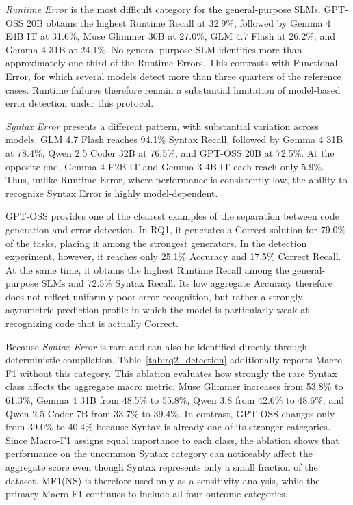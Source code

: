\emph{Runtime Error} is the most difficult category for the general-purpose SLMs. GPT-OSS 20B obtains the highest Runtime Recall at 32.9\%, followed by Gemma 4 E4B IT at 31.6\%, Muse Glimmer 30B at 27.0\%, GLM 4.7 Flash at 26.2\%, and Gemma 4 31B at 24.1\%. No general-purpose SLM identifies more than approximately one third of the Runtime Errors. This contrasts with Functional Error, for which several models detect more than three quarters of the reference cases. Runtime failures therefore remain a substantial limitation of model-based error detection under this protocol.

\emph{Syntax Error} presents a different pattern, with substantial variation across models. GLM 4.7 Flash reaches 94.1\% Syntax Recall, followed by Gemma 4 31B at 78.4\%, Qwen 2.5 Coder 32B at 76.5\%, and GPT-OSS 20B at 72.5\%. At the opposite end, Gemma 4 E2B IT and Gemma 3 4B IT each reach only 5.9\%. Thus, unlike Runtime Error, where performance is consistently low, the ability to recognize Syntax Error is highly model-dependent.

GPT-OSS provides one of the clearest examples of the separation between code generation and error detection. In RQ1, it generates a Correct solution for 79.0\% of the tasks, placing it among the strongest generators. In the detection experiment, however, it reaches only 25.1\% Accuracy and 17.5\% Correct Recall. At the same time, it obtains the highest Runtime Recall among the general-purpose SLMs and 72.5\% Syntax Recall. Its low aggregate Accuracy therefore does not reflect uniformly poor error recognition, but rather a strongly asymmetric prediction profile in which the model is particularly weak at recognizing code that is actually Correct.

Because \emph{Syntax Error} is rare and can also be identified directly through deterministic compilation, Table~\ref{tab:rq2_detection} additionally reports Macro-F1 without this category. This ablation evaluates how strongly the rare Syntax class affects the aggregate macro metric. Muse Glimmer increases from 53.8\% to 61.3\%, Gemma 4 31B from 48.5\% to 55.8\%, Qwen 3.8 from 42.6\% to 48.6\%, and Qwen 2.5 Coder 7B from 33.7\% to 39.4\%. In contrast, GPT-OSS changes only from 39.0\% to 40.4\% because Syntax is already one of its stronger categories. Since Macro-F1 assigns equal importance to each class, the ablation shows that performance on the uncommon Syntax category can noticeably affect the aggregate score even though Syntax represents only a small fraction of the dataset. MF1(NS) is therefore used only as a sensitivity analysis, while the primary Macro-F1 continues to include all four outcome categories.

